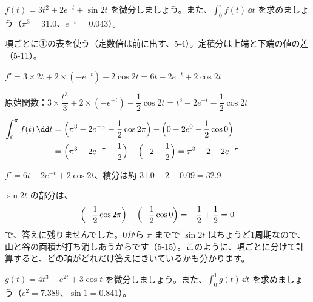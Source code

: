 \begin{reidai}
$f(t)=3t^2+2e^{-t}+\sin2t$ を微分しましょう。また、$\displaystyle\int_0^{\pi}f(t)\,\dd t$ を求めましょう（$\pi^3=31.0$、$e^{-\pi}=0.043$）。\par
\kangaekata 項ごとに①の表を使う（定数倍は前に出す、5-4）。定積分は上端と下端の値の差（5-11）。\par
\shiki $f'=3\times2t+2\times(-e^{-t})+2\cos2t=6t-2e^{-t}+2\cos2t$\par
\hspace*{2.6\zw}原始関数：$3\times\dfrac{t^3}{3}+2\times(-e^{-t})-\dfrac{1}{2}\cos2t=t^3-2e^{-t}-\dfrac{1}{2}\cos2t$\par
\hspace*{2.6\zw}$\begin{aligned}[t]\int_0^{\pi}f(t)\,\dd t&=\Bigl(\pi^3-2e^{-\pi}-\frac{1}{2}\cos2\pi\Bigr)-\Bigl(0-2e^0-\frac{1}{2}\cos0\Bigr)\\
&=\Bigl(\pi^3-2e^{-\pi}-\frac{1}{2}\Bigr)-\Bigl(-2-\frac{1}{2}\Bigr)=\pi^3+2-2e^{-\pi}\end{aligned}$\par
\kotae $f'=6t-2e^{-t}+2\cos2t$、積分は約 $31.0+2-0.09=32.9$
\end{reidai}
$\sin2t$ の部分は、
\[ \Bigl(-\frac{1}{2}\cos2\pi\Bigr)-\Bigl(-\frac{1}{2}\cos0\Bigr)=-\frac{1}{2}+\frac{1}{2}=0 \]
で、答えに残りませんでした。0から $\pi$ までで $\sin2t$ はちょうど1周期なので、山と谷の面積が打ち消しあうからです（5-15）。このように、項ごとに分けて計算すると、どの項がどれだけ答えにきいているかも分かります。

\begin{jibun}
$g(t)=4t^3-e^{2t}+3\cos t$ を微分しましょう。また、$\displaystyle\int_0^1g(t)\,\dd t$ を求めましょう（$e^2=7.389$、$\sin1=0.841$）。
\end{jibun}

